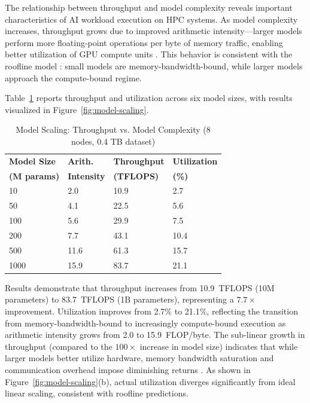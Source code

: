 \documentclass{llncs}
\begin{document}
The relationship between throughput and model complexity reveals important characteristics of AI workload execution on HPC systems. As model complexity increases, throughput grows due to improved arithmetic intensity---larger models perform more floating-point operations per byte of memory traffic, enabling better utilization of GPU compute units \cite{Jia2018}. This behavior is consistent with the roofline model \cite{Williams2009Roofline}: small models are memory-bandwidth-bound, while larger models approach the compute-bound regime.

Table~\ref{tab:model-scaling} reports throughput and utilization across six model sizes, with results visualized in Figure~\ref{fig:model-scaling}.

\begin{table}[t]
\centering
\caption{Model Scaling: Throughput vs. Model Complexity (8 nodes, 0.4 TB dataset)}
\label{tab:model-scaling}
\begin{tabular*}{\columnwidth}{@{\extracolsep{\fill}} llll @{}}
\toprule
\textbf{Model Size} & \textbf{Arith.} & \textbf{Throughput} & \textbf{Utilization} \\
\textbf{(M params)} & \textbf{Intensity} & \textbf{(TFLOPS)} & \textbf{(\%)} \\
\midrule
10 & 2.0 & 10.9 & 2.7 \\
50 & 4.1 & 22.5 & 5.6 \\
100 & 5.6 & 29.9 & 7.5 \\
200 & 7.7 & 43.1 & 10.4 \\
500 & 11.6 & 61.3 & 15.7 \\
1000 & 15.9 & 83.7 & 21.1 \\
\bottomrule
\end{tabular*}
\end{table}

Results demonstrate that throughput increases from 10.9~TFLOPS (10M parameters) to 83.7~TFLOPS (1B parameters), representing a $7.7\times$ improvement. Utilization improves from 2.7\% to 21.1\%, reflecting the transition from memory-bandwidth-bound to increasingly compute-bound execution as arithmetic intensity grows from 2.0 to 15.9~FLOP/byte. The sub-linear growth in throughput (compared to the $100\times$ increase in model size) indicates that while larger models better utilize hardware, memory bandwidth saturation and communication overhead impose diminishing returns \cite{Sun2019}. As shown in Figure~\ref{fig:model-scaling}(b), actual utilization diverges significantly from ideal linear scaling, consistent with roofline predictions.
\end{document}
